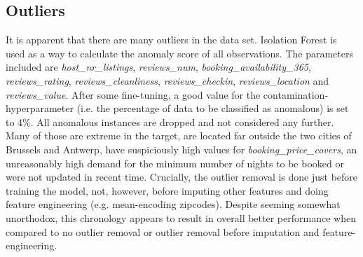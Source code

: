 \documentclass[11pt, oneside]{article}   	%
\begin{document}
\subsection{Outliers}
It is apparent that there are many outliers in the data set. Isolation Forest is used as a way to calculate the anomaly score of all observations. The parameters included are \textit{host\_nr\_listings}, \textit{reviews\_num}, \textit{booking\_availability\_365}, \textit{reviews\_rating}, \textit{reviews\_cleanliness}, \textit{reviews\_checkin}, \textit{reviews\_location} and \textit{reviews\_value}.  After some fine-tuning, a good value for the contamination-hyperparameter (i.e. the percentage of data  to be classified as anomalous) is set to 4\%. All anomalous instances are dropped and not considered any further. Many of those are extreme in the target, are located far outside the two cities of Brussels and Antwerp, have suspiciously high values for \textit{booking\_price\_covers}, an unreasonably high demand for the minimum number of nights to be booked or were not updated in recent time.\newline
\indent Crucially, the outlier removal is done just before training the model, not, however, before imputing other features and doing feature engineering (e.g. mean-encoding zipcodes). Despite seeming somewhat unorthodox, this chronology appears to result in overall better performance when compared to no outlier removal or outlier removal before imputation and feature-engineering.
\end{document}
